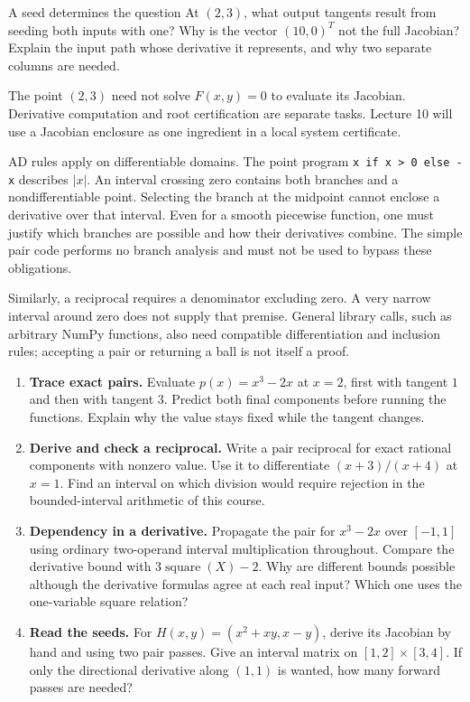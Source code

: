 \begin{question}{A seed determines the question}
At $(2,3)$, what output tangents result from seeding both inputs with one?
Why is the vector $(10,0)^T$ not the full Jacobian? Explain the input path
whose derivative it represents, and why two separate columns are needed.
\end{question}

The point $(2,3)$ need not solve $F(x,y)=0$ to evaluate its Jacobian.
Derivative computation and root certification are separate tasks. Lecture 10
will use a Jacobian enclosure as one ingredient in a local system certificate.

\newpage
{}
AD rules apply on differentiable domains. The point program
\texttt{x if x > 0 else -x} describes $|x|$. An interval crossing zero
contains both branches and a nondifferentiable point. Selecting the branch
at the midpoint cannot enclose a derivative over that interval. Even for a
smooth piecewise function, one must justify which branches are possible
and how their derivatives combine. The simple pair code performs no branch
analysis and must not be used to bypass these obligations.

Similarly, a reciprocal requires a denominator excluding zero. A very narrow
interval around zero does not supply that premise. General library calls,
such as arbitrary NumPy functions, also need compatible differentiation and
inclusion rules; accepting a pair or returning a ball is not itself a proof.

\begin{enumerate}
\item \textbf{Trace exact pairs.} Evaluate $p(x)=x^3-2x$ at $x=2$, first
with tangent $1$ and then with tangent $3$. Predict both final components
before running the functions. Explain why the value stays fixed while the
tangent changes.

\item \textbf{Derive and check a reciprocal.} Write a pair reciprocal for
exact rational components with nonzero value. Use it to differentiate
$(x+3)/(x+4)$ at $x=1$. Find an interval on which division would require
rejection in the bounded-interval arithmetic of this course.

\item \textbf{Dependency in a derivative.} Propagate the pair for $x^3-2x$
over $[-1,1]$ using ordinary two-operand interval multiplication throughout.
Compare the derivative bound with $3\operatorname{square}(X)-2$.
Why are different bounds possible although the derivative formulas agree
at each real input? Which one uses the one-variable square relation?

\item \textbf{Read the seeds.} For $H(x,y)=(x^2+xy,x-y)$, derive its
Jacobian by hand and using two pair passes. Give an interval matrix on
$[1,2]\times[3,4]$. If only the directional derivative along $(1,1)$ is
wanted, how many forward passes are needed?
\end{enumerate}

